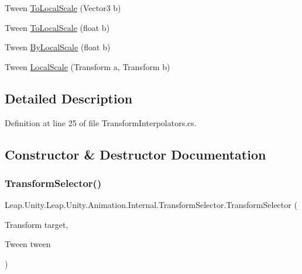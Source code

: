\begin{DoxyCompactItemize}
Tween \mbox{\hyperlink{struct_leap_1_1_unity_1_1_leap_1_1_unity_1_1_animation_1_1_internal_1_1_transform_selector_a33d8a7f76cad0ea2e7a54eb5513fda2d}{To\+Local\+Scale}} (Vector3 b)
\item 
Tween \mbox{\hyperlink{struct_leap_1_1_unity_1_1_leap_1_1_unity_1_1_animation_1_1_internal_1_1_transform_selector_a1b6822af20f1f90ace3eebe6095711da}{To\+Local\+Scale}} (float b)
\item 
Tween \mbox{\hyperlink{struct_leap_1_1_unity_1_1_leap_1_1_unity_1_1_animation_1_1_internal_1_1_transform_selector_a7f45e638712855dc07b33691f3547a2b}{By\+Local\+Scale}} (float b)
\item 
Tween \mbox{\hyperlink{struct_leap_1_1_unity_1_1_leap_1_1_unity_1_1_animation_1_1_internal_1_1_transform_selector_a4827065abda49368d84a3d5432cfe8aa}{Local\+Scale}} (Transform a, Transform b)
\end{DoxyCompactItemize}


\subsection{Detailed Description}


Definition at line 25 of file Transform\+Interpolators.\+cs.



\subsection{Constructor \& Destructor Documentation}
\mbox{\label{struct_leap_1_1_unity_1_1_leap_1_1_unity_1_1_animation_1_1_internal_1_1_transform_selector_af004cc1165616369a41a8af27b0bb71e}} 
\subsubsection{\texorpdfstring{TransformSelector()}{TransformSelector()}}
{\footnotesize\ttfamily Leap.\+Unity.\+Leap.\+Unity.\+Animation.\+Internal.\+Transform\+Selector.\+Transform\+Selector (\begin{DoxyParamCaption}\item[{Transform}]{target,  }\item[{Tween}]{tween }\end{DoxyParamCaption})}



